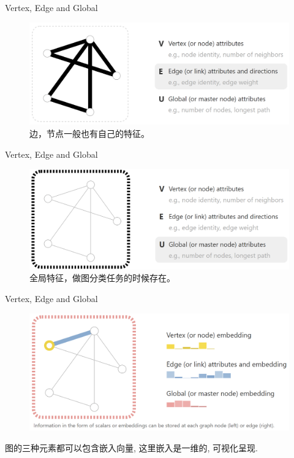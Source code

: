 \documentclass{beamer}
\begin{document}
\begin{frame}{Vertex, Edge and Global}
    \begin{figure}
        \includegraphics[width=\textwidth]{edge.png}
        \caption{边，节点一般也有自己的特征。}
    \end{figure}
\end{frame}

\begin{frame}{Vertex, Edge and Global}
    \begin{figure}
        \includegraphics[width=\textwidth]{global.png}
        \caption{全局特征，做图分类任务的时候存在。}
    \end{figure}
\end{frame}

\begin{frame}{Vertex, Edge and Global}
    \begin{figure}
        \includegraphics[width=\textwidth]{graph.png}
    \end{figure}
    图的三种元素都可以包含嵌入向量, 这里嵌入是一维的, 可视化呈现.
\end{frame}
\end{document}
